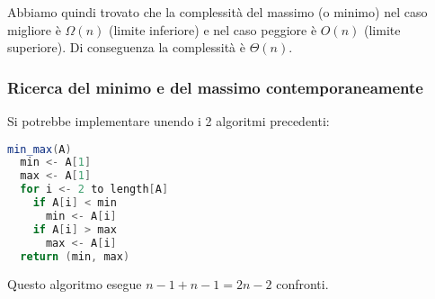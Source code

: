 \documentclass[a4paper]{article}
\begin{document}
\vspace{1em}
\noindent
Abbiamo quindi trovato che la complessità del massimo (o minimo) nel caso migliore è 
\( \Omega(n) \) (limite inferiore) e nel caso peggiore è \( O(n) \) (limite superiore).
Di conseguenza la complessità è \( \Theta(n) \).

\subsubsection{Ricerca del minimo e del massimo contemporaneamente}
Si potrebbe implementare unendo i 2 algoritmi precedenti:
\begin{lstlisting}[language=Scala]
min_max(A)
  min <- A[1]
  max <- A[1]
  for i <- 2 to length[A]
    if A[i] < min
      min <- A[i]
    if A[i] > max
      max <- A[i]
  return (min, max)
\end{lstlisting}
Questo algoritmo esegue \( n-1 + n-1 = 2n-2 \) confronti.
\end{document}
